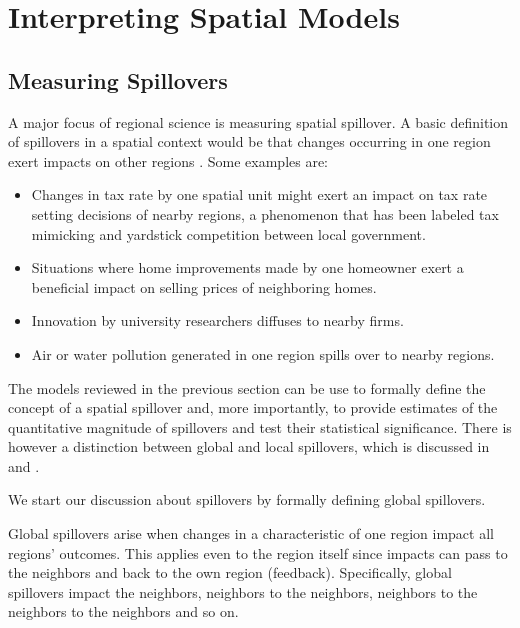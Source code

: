\documentclass[english,12pt]{book}\usepackage[]{graphicx}\usepackage[]{xcolor}
\begin{document}
\section{Interpreting Spatial Models}\label{sec:interpretation}

\subsection{Measuring Spillovers}

A major focus of regional science is measuring spatial spillover. A basic definition of spillovers in a spatial context would be that changes occurring in one region exert impacts on other regions \citep{LeSage2014}. Some examples are:

\begin{itemize}
  \item Changes in tax rate by one spatial unit might exert an impact on tax rate setting decisions of nearby regions, a phenomenon that has been labeled tax mimicking and yardstick competition between local government. 
  \item Situations where home improvements made by one homeowner exert a beneficial impact on selling prices of neighboring homes.
  \item Innovation by university researchers diffuses to nearby firms.
  \item Air or water pollution generated in one region spills over to nearby regions. 
\end{itemize}

The models reviewed in the previous section can be use to formally define the concept of a spatial spillover and,  more importantly, to provide estimates of the quantitative magnitude of spillovers and test their statistical significance.  There is however a distinction between global and local spillovers, which is discussed in \cite{anselin2003spatial} and \cite{LeSage2014}. 

We start our discussion about spillovers by formally defining global spillovers. 

\begin{definition}
	 Global spillovers arise when changes in a characteristic of one region impact all regions' outcomes. This applies even to the region itself since impacts can pass to the neighbors and back to the own region (feedback). Specifically, global spillovers impact the neighbors, neighbors to the neighbors, neighbors to the neighbors to the neighbors and so on. 
\end{definition}
\end{document}
